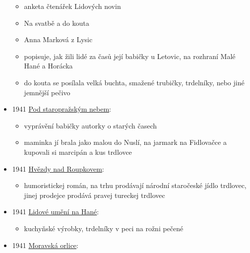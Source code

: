 \begin{itemize}
  \begin{itemize}
  \tightlist
  \item
    anketa čtenářek Lidových novin
  \item
    Na svatbě a do kouta
  \item
    Anna Marková z Lysic
  \item
    popisuje, jak žili lidé za časů její babičky u Letovic, na rozhraní
    Malé Hané a Horácka
  \item
    do kouta se posílala velká buchta, smažené trubičky, trdelníky, nebo
    jiné jemnější pečivo
  \end{itemize}
\item
  1941
  \href{https://ceskadigitalniknihovna.cz/view/uuid:5247f390-0408-11ed-bd12-005056827e51?page=uuid\%3Ac9bca5eb-64b6-4861-a251-c29522db0865&fulltext=trdlovce&source=mzk}{Pod
  staropražským nebem}:

  \begin{itemize}
  \tightlist
  \item
    vyprávění babičky autorky o starých časech
  \item
    maminka jí brala jako malou do Nuslí, na jarmark na Fidlovačce a
    kupovali si marcipán a kus trdlovce
  \end{itemize}
\item
  1941
  \href{https://ceskadigitalniknihovna.cz/view/uuid:5a644b90-81df-11e4-9d8c-005056827e51?page=uuid\%3A645f2680-95c9-11e4-a2db-005056825209&source=nkp}{Hvězdy
  nad Roupkovem}:

  \begin{itemize}
  \tightlist
  \item
    humoristickej román, na trhu prodávají národní staročeské jídlo
    trdlovec, jinej prodejce prodává pravej tureckej trdlovec
  \end{itemize}
\item
  1941
  \href{https://ceskadigitalniknihovna.cz/view/uuid:3d76f2a0-2cf6-11e4-8e0d-005056827e51?page=uuid\%3A4ffb7cf0-4b61-11e4-aded-005056827e51&fulltext=trdeln\%C3\%ADk\%20OR\%20trdeln\%C3\%ADky\%20OR\%20trdeln\%C3\%ADk\%C5\%AF&source=nkp}{Lidové
  umění na Hané}:

  \begin{itemize}
  \tightlist
  \item
    kuchyňské výrobky, trdelníky v peci na rožni pečené
  \end{itemize}
\item
  1941
  \href{https://ceskadigitalniknihovna.cz/view/uuid:196e9f80-fea6-11de-bd64-000d606f5dc6?page=uuid:30a645e0-fac8-11de-b0ad-000d606f5dc6&fulltext=trdeln\%C3\%AD*&source=mzk}{Moravská
  orlice}:


\end{itemize}
